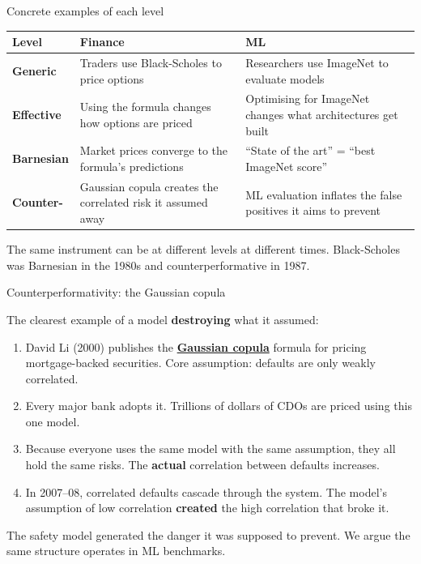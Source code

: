 \documentclass[aspectratio=169,11pt]{beamer}
\begin{document}
\begin{frame}{Concrete examples of each level}

\begin{center}
{\small
\begin{tabular}{p{2.5cm}p{4.5cm}p{4.5cm}}
\toprule
\textbf{Level} & \textbf{Finance} & \textbf{ML} \\
\midrule
\textbf{\textcolor{camera}{Generic}} & Traders use Black-Scholes to price options & Researchers use ImageNet to evaluate models \\[6pt]
\textbf{\textcolor{counter}{Effective}} & Using the formula changes how options are priced & Optimising for ImageNet changes what architectures get built \\[6pt]
\textbf{\textcolor{engine}{Barnesian}} & Market prices converge to the formula's predictions & ``State of the art'' = ``best ImageNet score'' \\[6pt]
\textbf{\textcolor{fail}{Counter-}} & Gaussian copula creates the correlated risk it assumed away & ML evaluation inflates the false positives it aims to prevent \\
\bottomrule
\end{tabular}
}
\end{center}

\vspace{0.3em}
{\small The same instrument can be at different levels at different times. Black-Scholes was Barnesian in the 1980s and counterperformative in 1987.}
\end{frame}

\begin{frame}[label=counterperf]{Counterperformativity: the Gaussian copula}

The clearest example of a model \textbf{destroying} what it assumed:

\vspace{0.5em}

\begin{enumerate}\setlength\itemsep{6pt}
  \item {\small David Li (2000) publishes the \href{https://en.wikipedia.org/wiki/Gaussian_copula}{\textbf{Gaussian copula}} formula for pricing mortgage-backed securities. Core assumption: defaults are only weakly correlated.}
  \item {\small Every major bank adopts it. Trillions of dollars of CDOs are priced using this one model.}
  \item {\small Because everyone uses the same model with the same assumption, they all hold the same risks. The \textbf{actual} correlation between defaults increases.}
  \item {\small In 2007--08, correlated defaults cascade through the system. The model's assumption of low correlation \textbf{created} the high correlation that broke it.}
\end{enumerate}

\vspace{0.5em}
{\small The safety model generated the danger it was supposed to prevent. We argue the same structure operates in ML benchmarks.}
\end{frame}
\end{document}
